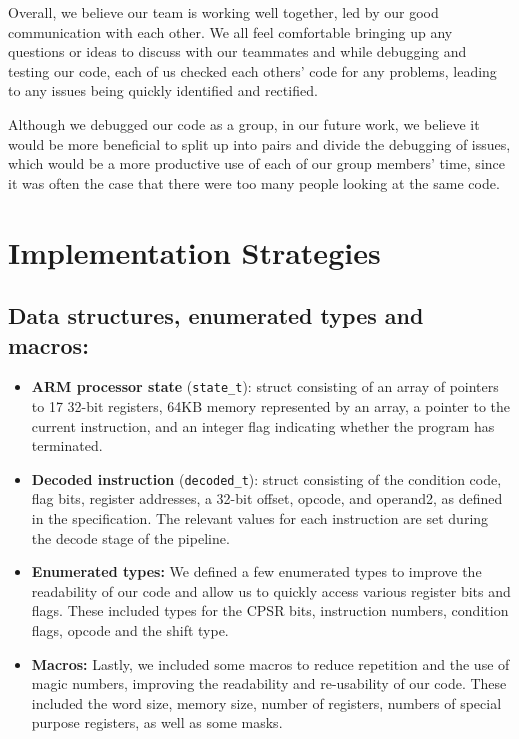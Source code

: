 \documentclass[11pt]{article}
\begin{document}
Overall, we believe our team is working well together, led by our good communication with each other. We all feel comfortable bringing up any questions or ideas to discuss with our teammates and while debugging and testing our code, each of us checked each others' code for any problems, leading to any issues being quickly identified and rectified.

Although we debugged our code as a group, in our future work, we believe it would be more beneficial to split up into pairs and divide the debugging of issues, which would be a more productive use of each of our group members' time, since it was often the case that there were too many people looking at the same code.

\section{Implementation Strategies}

\subsection{Data structures, enumerated types and macros:}

\begin{itemize}

\item \textbf{ARM processor state} (\texttt{state\_t}): struct consisting of an array of pointers to 17 32-bit registers, 64KB memory represented by an array, a pointer to the current instruction, and an integer flag indicating whether the program has terminated.

\item \textbf{Decoded instruction} (\texttt{decoded\_t}): struct consisting of the condition code, flag bits, register addresses, a 32-bit offset, opcode, and operand2, as defined in the specification. The relevant values for each instruction are set during the decode stage of the pipeline.

\item \textbf{Enumerated types:} We defined a few enumerated types to improve the readability of our code and allow us to quickly access various register bits and flags. These included types for the CPSR bits, instruction numbers, condition flags, opcode and the shift type.

\item \textbf{Macros:} Lastly, we included some macros to reduce repetition and the use of magic numbers, improving the readability and re-usability of our code. These included the word size, memory size, number of registers, numbers of special purpose registers, as well as some masks.

\end{itemize}
\end{document}
